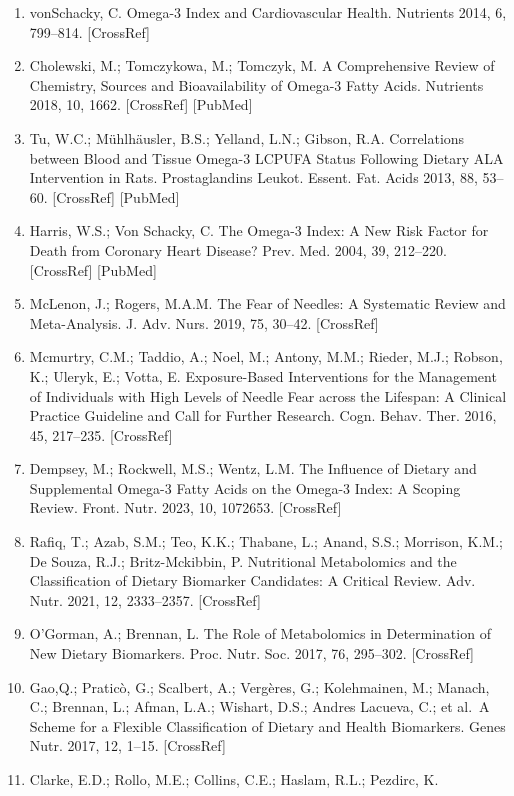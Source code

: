 \documentclass[journal=jacsat,manuscript=article]{achemso}
\begin{document}
\begin{enumerate}
\item
  vonSchacky, C. Omega-3 Index and Cardiovascular Health. Nutrients
  2014, 6, 799--814. {[}CrossRef{]}
\item
  Cholewski, M.; Tomczykowa, M.; Tomczyk, M. A Comprehensive Review of
  Chemistry, Sources and Bioavailability of Omega-3 Fatty Acids.
  Nutrients 2018, 10, 1662. {[}CrossRef{]} {[}PubMed{]}
\item
  Tu, W.C.; Mühlhäusler, B.S.; Yelland, L.N.; Gibson, R.A. Correlations
  between Blood and Tissue Omega-3 LCPUFA Status Following Dietary ALA
  Intervention in Rats. Prostaglandins Leukot. Essent. Fat. Acids 2013,
  88, 53--60. {[}CrossRef{]} {[}PubMed{]}
\item
  Harris, W.S.; Von Schacky, C. The Omega-3 Index: A New Risk Factor for
  Death from Coronary Heart Disease? Prev. Med. 2004, 39, 212--220.
  {[}CrossRef{]} {[}PubMed{]}
\item
  McLenon, J.; Rogers, M.A.M. The Fear of Needles: A Systematic Review
  and Meta-Analysis. J. Adv. Nurs. 2019, 75, 30--42. {[}CrossRef{]}
\item
  Mcmurtry, C.M.; Taddio, A.; Noel, M.; Antony, M.M.; Rieder, M.J.;
  Robson, K.; Uleryk, E.; Votta, E. Exposure-Based Interventions for the
  Management of Individuals with High Levels of Needle Fear across the
  Lifespan: A Clinical Practice Guideline and Call for Further Research.
  Cogn. Behav. Ther. 2016, 45, 217--235. {[}CrossRef{]}
\item
  Dempsey, M.; Rockwell, M.S.; Wentz, L.M. The Influence of Dietary and
  Supplemental Omega-3 Fatty Acids on the Omega-3 Index: A Scoping
  Review. Front. Nutr. 2023, 10, 1072653. {[}CrossRef{]}
\item
  Rafiq, T.; Azab, S.M.; Teo, K.K.; Thabane, L.; Anand, S.S.; Morrison,
  K.M.; De Souza, R.J.; Britz-Mckibbin, P. Nutritional Metabolomics and
  the Classification of Dietary Biomarker Candidates: A Critical Review.
  Adv. Nutr. 2021, 12, 2333--2357. {[}CrossRef{]}
\item
  O'Gorman, A.; Brennan, L. The Role of Metabolomics in Determination of
  New Dietary Biomarkers. Proc. Nutr. Soc. 2017, 76, 295--302.
  {[}CrossRef{]}
\item
  Gao,Q.; Praticò, G.; Scalbert, A.; Vergères, G.; Kolehmainen, M.;
  Manach, C.; Brennan, L.; Afman, L.A.; Wishart, D.S.; Andres Lacueva,
  C.; et al.~A Scheme for a Flexible Classification of Dietary and
  Health Biomarkers. Genes Nutr. 2017, 12, 1--15. {[}CrossRef{]}
\item
  Clarke, E.D.; Rollo, M.E.; Collins, C.E.; Haslam, R.L.; Pezdirc, K.

\end{enumerate}
\end{document}
